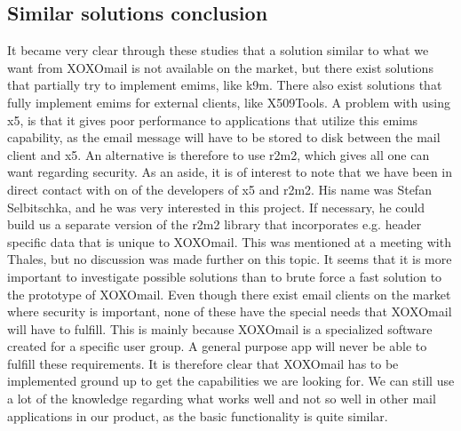 \subsection{Similar solutions conclusion}
It became very clear through these studies that a solution similar to what we want from XOXOmail is not available on the market, but there exist solutions that partially try to implement \gls{emims}, like \gls{k9m}. There also exist solutions that fully implement \gls{emims} for external clients, like X509Tools. A problem with using \gls{x5}, is that it gives poor performance to applications that utilize this \gls{emims} capability, as the email message will have to be stored to disk between the mail client and \gls{x5}. An alternative is therefore to use \gls{r2m2}, which gives all one can want regarding security.
\newline
\newline
As an aside, it is of interest to note that we have been in direct contact with on of the developers of \gls{x5} and \gls{r2m2}. His name was Stefan Selbitschka, and he was very interested in this project. If necessary, he could build us a separate version of the \gls{r2m2} library that incorporates e.g. header specific data that is unique to XOXOmail. This was mentioned at a meeting with Thales, but no discussion was made further on this topic. It seems that it is more important to investigate possible solutions than to brute force a fast solution to the prototype of XOXOmail.
\newline
\newline
Even though there exist email clients on the market where security is important, none of these have the special needs that XOXOmail will have to fulfill. This is mainly because XOXOmail is a specialized software created for a specific user group. A general purpose app will never be able to fulfill these requirements. It is therefore clear that XOXOmail has to be implemented ground up to get the capabilities we are looking for. We can still use a lot of the knowledge regarding what works well and not so well in other mail applications in our product, as the basic functionality is quite similar.

